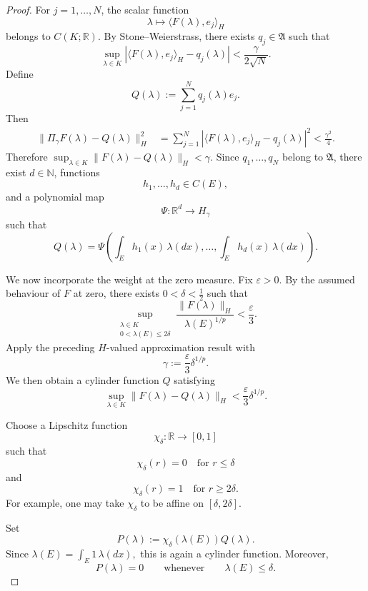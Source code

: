 \documentclass[10pt,a4paper]{amsart}
\begin{document}
\begin{proof}
For \(j=1,\ldots,N\), the scalar function
\[
        \lambda
        \longmapsto
        \bigl\langle F(\lambda),e_j\bigr\rangle_H
\]
belongs to \(C(K;\mathbb R)\). By Stone--Weierstrass, there exists
\(q_j\in\mathfrak A\) such that
\[
        \sup_{\lambda\in K}
        \left|
        \bigl\langle F(\lambda),e_j\bigr\rangle_H
        -
        q_j(\lambda)
        \right|
        <
        \frac{\gamma}{2\sqrt{N}}.
\]
Define
\[
        Q(\lambda)
        :=
        \sum_{j=1}^N q_j(\lambda)e_j.
\]
Then
\[
\begin{aligned}
\lVert \Pi_\gamma F(\lambda)-Q(\lambda)\rVert_H^2
&=
\sum_{j=1}^N
\left|
\bigl\langle F(\lambda),e_j\bigr\rangle_H
-
q_j(\lambda)
\right|^2
<
\frac{\gamma^2}{4}.
\end{aligned}
\]
Therefore
$
        \sup_{\lambda\in K}
        \lVert F(\lambda)-Q(\lambda)\rVert_H
        <
        \gamma.
$ Since \(q_1,\ldots,q_N\) belong to \(\mathfrak A\), there exist
\(d\in\mathbb N\), functions
\[
        h_1,\ldots,h_d\in C(E),
\]
and a polynomial map
\[
        \Psi:\mathbb R^d\longrightarrow H_\gamma
\]
such that
\[
        Q(\lambda)
        =
        \Psi
        \left(
        \int_Eh_1(x)\,\lambda(dx),
        \ldots,
        \int_Eh_d(x)\,\lambda(dx)
        \right).
\]

We now incorporate the weight at the zero measure. Fix
\(\varepsilon>0\). By the assumed behaviour of \(F\) at zero, there
exists
$
        0<\delta<\frac12
$
such that
\[
\sup_{\substack{\lambda\in K\\
                 0<\lambda(E)\le2\delta}}
\frac{\lVert F(\lambda)\rVert_H}
     {\lambda(E)^{1/p}}
<
\frac{\varepsilon}{3}.
\]
Apply the preceding \(H\)-valued approximation result with
\[
        \gamma
        :=
        \frac{\varepsilon}{3}\delta^{1/p}.
\]
We then obtain a cylinder function \(Q\) satisfying
\[
        \sup_{\lambda\in K}
        \lVert F(\lambda)-Q(\lambda)\rVert_H
        <
        \frac{\varepsilon}{3}\delta^{1/p}.
\]

Choose a Lipschitz function
\[
        \chi_\delta:\mathbb R\longrightarrow[0,1]
\]
such that
\[
        \chi_\delta(r)=0
        \quad\text{for }r\le\delta
\]
and
\[
        \chi_\delta(r)=1
        \quad\text{for }r\ge2\delta.
\]
For example, one may take \(\chi_\delta\) to be affine on
\([\delta,2\delta]\).

Set
\[
        P(\lambda)
        :=
        \chi_\delta(\lambda(E))Q(\lambda).
\]
Since
$
        \lambda(E)=\int_E1\,\lambda(dx),
$
this is again a cylinder function. Moreover,
\[
        P(\lambda)=0
        \qquad\text{whenever}\qquad
        \lambda(E)\le\delta.
\]


\end{proof}
\end{document}
